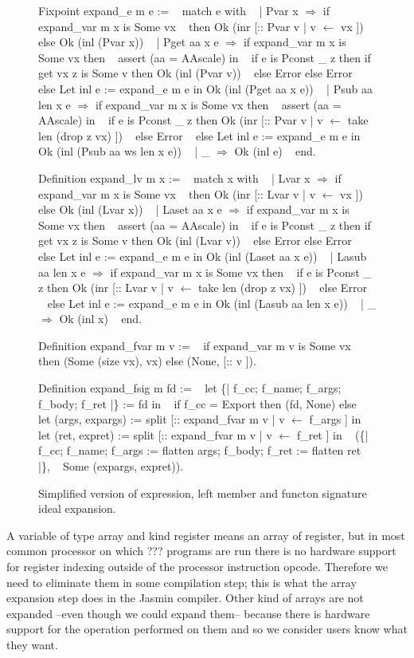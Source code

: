 \documentclass{article}
\begin{document}
\begin{figure}[p]
\obeylines\obeyspaces\ttfamily%
Fixpoint expand\_e m e := 
~ match e with
~ | Pvar x \(\Rightarrow\) if expand\_var m x is Some vx
~   then Ok (inr [:: Pvar v | v \(\leftarrow\) vx ]) else Ok (inl (Pvar x))
~ | Pget aa x e \(\Rightarrow\) if expand\_var m x is Some vx then
~     assert (aa = AAscale) in
~     if e is Pconst \_ z then if get vx z is Some v then Ok (inl (Pvar v))
~     else Error else Error
~   else Let inl e := expand\_e m e in Ok (inl (Pget aa x e))
~ | Psub aa len x e \(\Rightarrow\) if expand\_var m x is Some vx then
~     assert (aa = AAscale) in
~     if e is Pconst \_ z then Ok (inr [:: Pvar v | v \(\leftarrow\) take len (drop z vx) ])
~     else Error
~   else Let inl e := expand\_e m e in Ok (inl (Psub aa ws len x e))
~ | \_ \(\Rightarrow\) Ok (inl e)
~ end.

Definition expand\_lv m x :=
~ match x with
~ | Lvar x \(\Rightarrow\) if expand\_var m x is Some vx
~   then Ok (inr [:: Lvar v | v \(\leftarrow\) vx ]) else Ok (inl (Lvar x))
~ | Laset aa x e \(\Rightarrow\) if expand\_var m x is Some vx then
~     assert (aa = AAscale) in
~     if e is Pconst \_ z then if get vx z is Some v then Ok (inl (Lvar v))
~     else Error else Error
~   else Let inl e := expand\_e m e in Ok (inl (Laset aa x e))
~ | Lasub aa len x e \(\Rightarrow\) if expand\_var m x is Some vx then
~     if e is Pconst \_ z then Ok (inr [:: Lvar v | v \(\leftarrow\) take len (drop z vx) ])
~     else Error
~   else Let inl e := expand\_e m e in Ok (inl (Lasub aa len x e))
~ | \_ \(\Rightarrow\) Ok (inl x)
~ end.

Definition expand\_fvar m v :=
~ if expand\_var m v is Some vx then (Some (size vx), vx) else (None, [:: v ]).

Definition expand\_fsig m fd :=
~ let \{| f\_cc; f\_name; f\_args; f\_body; f\_ret |\} := fd in
~ if f\_cc = Export then (fd, None) else
~ let (args, expargs) := split [:: expand\_fvar m v | v \(\leftarrow\) f\_args ] in
~ let (ret,  expret)  := split [:: expand\_fvar m v | v \(\leftarrow\) f\_ret  ] in
~ (\{| f\_cc; f\_name; f\_args := flatten args; f\_body; f\_ret := flatten ret |\},
~   Some (expargs, expret)).
\normalfont%
\caption{Simplified version of expression, left member and functon signature ideal expansion.}
\end{figure}

A variable of type array and kind register means an array of register, but in
most common processor on which ??? programs are run there is no hardware support
for register indexing outside of the processor instruction opcode. Therefore we
need to eliminate them in some compilation step; this is what the array
expansion step does in the Jasmin compiler. Other kind of arrays are not
expanded --even though we could expand them-- because there is hardware support
for the operation performed on them and so we consider users know what they want.
\end{document}
